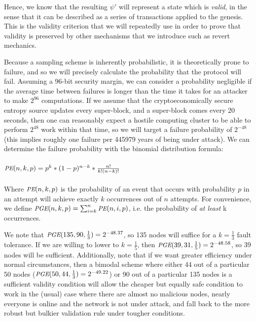 \documentclass[11pt,a4paper]{article}
\makeatletter
\theoremstyle{plain}
\theoremstyle{definition}
\theoremstyle{remark}
\newcommand{\ie}{i.e.\@\xspace}
\newcommand{\makeintoafunction}[1]{\textit{\uppercase{\small #1}}}
\newcommand{\PGE}{\makeintoafunction{pge}}
\newcommand{\PE}{\makeintoafunction{pe}}
\makeatother
\begin{document}
Hence, we know that the resulting $\psi'$ will represent a state which is \emph{valid}, in the sense that it can be described as a series of transactions applied to the genesis. This is the validity criterion that we will repeatedly use in order to prove that validity is preserved by other mechanisms that we introduce such as revert mechanics.

Because a sampling scheme is inherently probabilistic, it is theoretically prone to failure, and so we will precisely calculate the probability that the protocol will fail. Assuming a 96-bit security margin, we can consider a probability negligible if the average time between failures is longer than the time it takes for an attacker to make $2^{96}$ computations. If we assume that the cryptoeconomically secure entropy source updates every super-block, and a super-block comes every 20 seconds, then one can reasonably expect a hostile computing cluster to be able to perform $2^{48}$ work within that time, so we will target a failure probability of $2^{-48}$ (this implies roughly one failure per 445979 years of being under attack). We can determine the failure probability with the binomial distribution formula:
\\
\\
$\PE(n, k, p) = p^k * (1-p)^{n-k} * \frac{n!}{k!(n-k)!}$
\\
\\
Where $\PE(n, k, p)$ is the probability of an event that occurs with probability $p$ in an attempt will achieve exactly $k$ occurrences out of $n$ attempts. For convenience, we define $\PGE(n, k, p) = \sum_{i=k}^n \PE(n, i, p)$, \ie the probability of \emph{at least} k occurrences.

We note that $\PGE(135, 90, \frac{1}{3}) = 2^{-48.37}$, so 135 nodes will suffice for a $k = \frac{1}{3}$ fault tolerance. If we are willing to lower to $k = \frac{1}{5}$, then $\PGE(39, 31, \frac{1}{5}) = 2^{-48.58}$, so 39 nodes will be sufficient. Additionally, note that if we want greater efficiency under normal circumstances, then a bimodal scheme where either 44 out of a particular 50 nodes ($\PGE(50, 44, \frac{1}{3}) = 2^{-49.22}$) or 90 out of a particular 135 nodes is a sufficient validity condition will allow the cheaper but equally safe condition to work in the (usual) case where there are almost no malicious nodes, nearly everyone is online and the network is not under attack, and fall back to the more robust but bulkier validation rule under tougher conditions.
\end{document}
